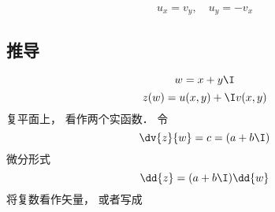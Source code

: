 
\begin{equation}\label{CauRie_eq1}
u_{x}=v_{y}, \quad u_{y}=-v_{x}
\end{equation}


\subsection{推导}
\begin{equation}
w = x + y\I
\end{equation}
\begin{equation}
z(w) = u(x, y) + \I v(x, y)
\end{equation}
复平面上， 看作两个实函数． 令
\begin{equation}
\dv{z}{w} = c = (a + b\I)
\end{equation}
微分形式
\begin{equation}
\dd{z} = (a + b\I)\dd{w}
\end{equation}
将复数看作矢量， 或者写成
\begin{equation}

\end{equation}
